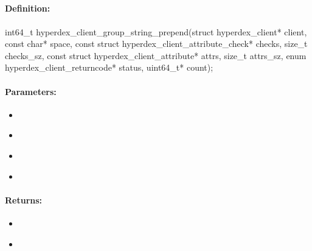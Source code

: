 \pagebreak
\subsection{}
\label{api:c:group_string_prepend}


\paragraph{Definition:}
\begin{ccode}
int64_t hyperdex_client_group_string_prepend(struct hyperdex_client* client,
        const char* space,
        const struct hyperdex_client_attribute_check* checks, size_t checks_sz,
        const struct hyperdex_client_attribute* attrs, size_t attrs_sz,
        enum hyperdex_client_returncode* status,
        uint64_t* count);
\end{ccode}

\paragraph{Parameters:}
\begin{itemize}[noitemsep]
\item {}\\

\item {}\\

\item {}\\

\item {}\\

\end{itemize}

\paragraph{Returns:}
\begin{itemize}[noitemsep]
\item {}\\

\item {}\\

\end{itemize}

